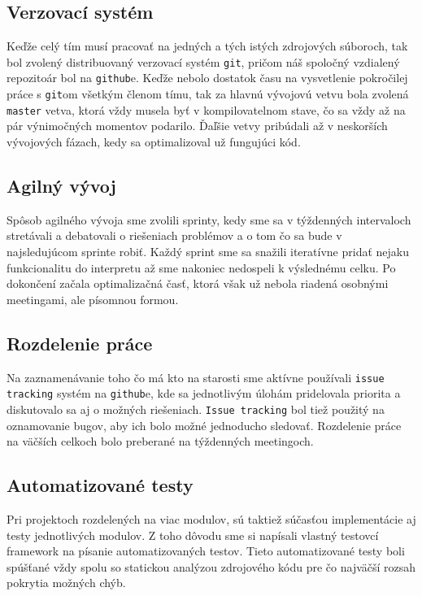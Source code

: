 \documentclass[12pt,a4paper,titlepage,final]{article}
\begin{document}
\subsection{Verzovací systém}
Keďže celý tím musí pracovať na jedných a tých istých zdrojových súboroch, tak
bol zvolený distribuovaný verzovací systém \texttt{git}, pričom náš spoločný vzdialený
repozitoár bol na \texttt{github}e. Keďže nebolo dostatok času na vysvetlenie
pokročilej práce s \texttt{git}om všetkým členom tímu, tak za hlavnú vývojovú vetvu
bola zvolená \texttt{master} vetva, ktorá vždy musela byť v kompilovatelnom stave, čo
sa vždy až na pár výnimočných momentov podarilo. Ďaľšie vetvy pribúdali až v neskorších vývojových
fázach, kedy sa optimalizoval už fungujúci kód.

\subsection{Agilný vývoj}
Spôsob agilného vývoja sme zvolili sprinty, kedy sme sa v týždenných intervaloch
stretávali a debatovali o riešeniach problémov a o tom čo sa bude v najsledujúcom sprinte
robiť. Každý sprint sme sa snažili iteratívne pridať nejaku funkcionalitu do interpretu
až sme nakoniec nedospeli k výslednému celku. Po dokončení začala optimalizačná časť, 
ktorá však už nebola riadená osobnými meetingami, ale písomnou formou.

\subsection{Rozdelenie práce}
Na zaznamenávanie toho čo má kto na starosti sme aktívne používali \texttt{issue tracking}
systém na \texttt{github}e, kde sa jednotlivým úlohám pridelovala priorita
a diskutovalo sa aj o možných riešeniach. \texttt{Issue tracking} bol tiež použitý
na oznamovanie bugov, aby ich bolo možné jednoducho sledovať. Rozdelenie práce na väčších
celkoch bolo preberané na týždenných meetingoch.

\subsection{Automatizované testy}
Pri projektoch rozdelených na viac modulov, sú taktiež súčasťou implementácie aj
testy jednotlivých modulov. Z toho dôvodu sme si napísali vlastný testovcí framework
na písanie automatizovaných testov. Tieto automatizované testy boli spúšťané vždy spolu
so statickou analýzou zdrojového kódu pre čo najväčší rozsah pokrytia možných chýb.
\end{document}
